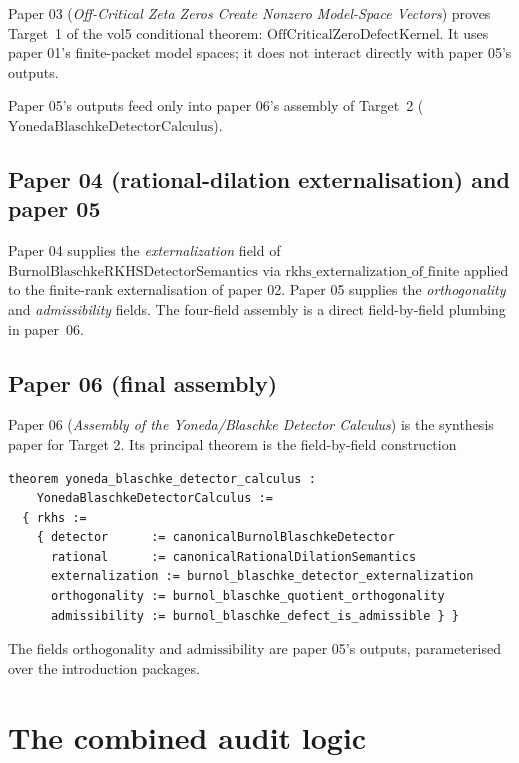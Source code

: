 \documentclass[12pt]{article}
\theoremstyle{definition}
\theoremstyle{remark}
\begin{document}
Paper 03 (\textit{Off-Critical Zeta Zeros Create Nonzero Model-Space Vectors}) proves Target~1 of the vol5 conditional theorem: $\mathrm{OffCriticalZeroDefectKernel}$. It uses paper 01's finite-packet model spaces; it does not interact directly with paper 05's outputs.

Paper 05's outputs feed only into paper 06's assembly of Target~2 ($\mathrm{YonedaBlaschkeDetectorCalculus}$).

\subsection{Paper 04 (rational-dilation externalisation) and paper 05}

Paper 04 supplies the \emph{externalization} field of $\mathrm{BurnolBlaschkeRKHSDetectorSemantics}$ via $\mathrm{rkhs\_externalization\_of\_finite}$ applied to the finite-rank externalisation of paper 02. Paper 05 supplies the \emph{orthogonality} and \emph{admissibility} fields. The four-field assembly is a direct field-by-field plumbing in paper~06.

\subsection{Paper 06 (final assembly)}

Paper 06 (\textit{Assembly of the Yoneda/Blaschke Detector Calculus}) is the synthesis paper for Target 2. Its principal theorem is the field-by-field construction
\begin{verbatim}
theorem yoneda_blaschke_detector_calculus :
    YonedaBlaschkeDetectorCalculus :=
  { rkhs :=
    { detector      := canonicalBurnolBlaschkeDetector
      rational      := canonicalRationalDilationSemantics
      externalization := burnol_blaschke_detector_externalization
      orthogonality := burnol_blaschke_quotient_orthogonality
      admissibility := burnol_blaschke_defect_is_admissible } }
\end{verbatim}
The fields $\mathrm{orthogonality}$ and $\mathrm{admissibility}$ are paper 05's outputs, parameterised over the introduction packages.

\section{The combined audit logic}\label{sec:auditLogic}
\end{document}
